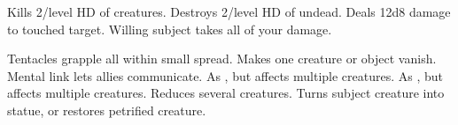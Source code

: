 \begin{swspelllist}
\M Kills 2/level HD of creatures.
\M Destroys 2/level HD of undead.
 Deals 12d8 damage to touched target.
 Willing subject takes all of your damage.

 Tentacles grapple all within small spread.
 Makes one creature or object vanish.
 Mental link lets allies communicate.
 As , but affects multiple creatures.
 As , but affects multiple creatures.
 Reduces several creatures.
 Turns subject creature into statue, or restores petrified creature.
\end{swspelllist}

